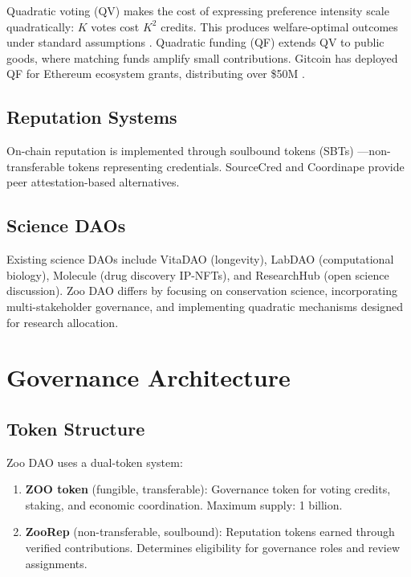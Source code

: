 \documentclass[11pt,a4paper]{article}
\newcommand{\ZOO}{\textsc{ZOO}}
\begin{document}
Quadratic voting (QV) \citep{lalley2018quadratic} makes the cost of
expressing preference intensity scale quadratically: $K$ votes cost
$K^2$ credits. This produces welfare-optimal outcomes under standard
assumptions \citep{posner2018radical}. Quadratic funding (QF)
\citep{buterin2019flexible} extends QV to public goods, where matching
funds amplify small contributions. Gitcoin has deployed QF for Ethereum
ecosystem grants, distributing over \$50M \citep{gitcoin2023}.

\subsection{Reputation Systems}

On-chain reputation is implemented through soulbound tokens (SBTs)
\citep{weyl2022decentralized}---non-transferable tokens representing
credentials. SourceCred \citep{sourcecred2020} and Coordinape
\citep{coordinape2021} provide peer attestation-based alternatives.

\subsection{Science DAOs}

Existing science DAOs include VitaDAO (longevity), LabDAO (computational
biology), Molecule (drug discovery IP-NFTs), and ResearchHub (open science
discussion). Zoo DAO differs by focusing on conservation science,
incorporating multi-stakeholder governance, and implementing quadratic
mechanisms designed for research allocation.


\section{Governance Architecture}
\label{sec:architecture}

\subsection{Token Structure}

Zoo DAO uses a dual-token system:

\begin{enumerate}
  \item \textbf{\ZOO{} token} (fungible, transferable): Governance token
    for voting credits, staking, and economic coordination. Maximum
    supply: 1 billion.

  \item \textbf{ZooRep} (non-transferable, soulbound): Reputation tokens
    earned through verified contributions. Determines eligibility for
    governance roles and review assignments.
\end{enumerate}
\end{document}
